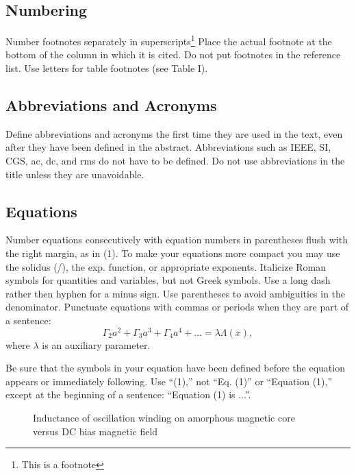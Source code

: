 \documentclass[letterpaper, 10 pt, conference]{ieeeconf}  %
\begin{document}
\subsection{Numbering}

Number footnotes separately in superscripts\footnote{This is a footnote}
Place the actual footnote at the bottom of the column in which it is cited.
Do not put footnotes in the reference list.
Use letters for table footnotes (see Table I).

\subsection{Abbreviations and Acronyms}

Define abbreviations and acronyms the first time they are used in the text,
even after they have been defined in the abstract. Abbreviations such as
IEEE, SI, CGS, ac, dc, and rms do not have to be defined. Do not use
abbreviations in the title unless they are unavoidable.

\subsection{Equations}

Number equations consecutively with equation numbers in parentheses flush
 with the right margin, as in (1). To make your equations more compact
 you may use the solidus (/), the exp. function, or appropriate exponents.
  Italicize Roman symbols for quantities and variables, but not Greek symbols.
   Use a long dash rather then hyphen for a minus sign. Use parentheses to avoid
    ambiguities in the denominator.
Punctuate equations with commas or periods when they are part of a sentence:
$$\Gamma_2 a^2 + \Gamma_3 a^3 + \Gamma_4 a^4 + ... = \lambda \Lambda(x),$$
where $\lambda$ is an auxiliary parameter.

Be sure that the symbols in your equation have been defined before the
equation appears or immediately following.
Use ``(1),'' not ``Eq. (1)'' or ``Equation (1),''
except at the beginning of a sentence: ``Equation (1) is ...''.

   \begin{figure}[thpb]
      \centering
      \caption{Inductance of oscillation winding on amorphous
       magnetic core versus DC bias magnetic field}
      \label{figurelabel}
   \end{figure}
\end{document}
